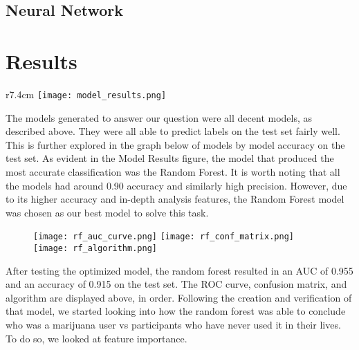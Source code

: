 \documentclass{article}
\begin{document}
\subsection{Neural Network}

\section{Results}
\begin{wrapfigure}{r}{7.4cm}
  \centering
  \texttt{[image: model\_results.png]}
\end{wrapfigure}
The models generated to answer our question were all decent models, as described above. They were all able to predict labels on the test set fairly well. This is further explored in the graph below of models by model accuracy on the test set. 
As evident in the Model Results figure, the model that produced the most accurate classification was the Random Forest. It is worth noting that all the models had around 0.90 accuracy and similarly high precision. However, due to its higher accuracy and in-depth analysis features, the Random Forest model was chosen as our best model to solve this task.
\begin{figure}[htp]
\centering
\texttt{[image: rf\_auc\_curve.png]}\hfill
\texttt{[image: rf\_conf\_matrix.png]}\hfill
\texttt{[image: rf\_algorithm.png]}
\end{figure}

\noindent After testing the optimized model, the random forest resulted in an AUC of 0.955 and an accuracy of 0.915 on the test set. The ROC curve, confusion matrix, and algorithm are displayed above, in order. Following the creation and verification of that model, we started looking into how the random forest was able to conclude who was a marijuana user vs participants who have never used it in their lives. To do so, we looked at feature importance.
\end{document}
